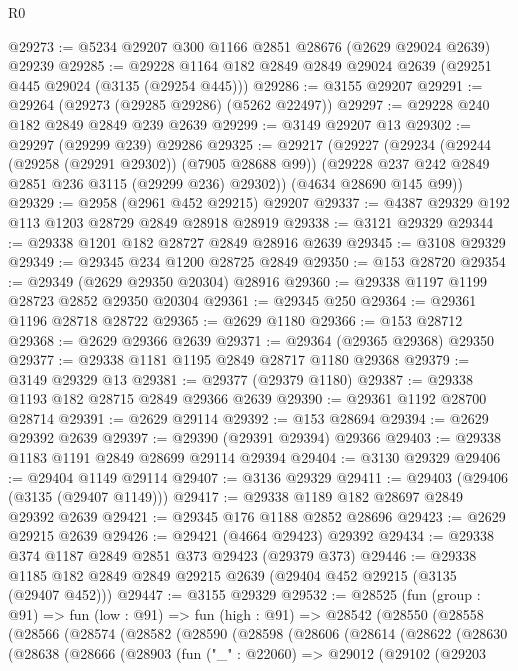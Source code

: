 \begin{lexlean}{R0}
\begin{coremodule}
@29273 := @5234 @29207 @300 @1166 @2851 @28676 (@2629 @29024 @2639) @29239
@29285 := @29228 @1164 @182 @2849 @2849 @29024 @2639 (@29251 @445 @29024 (@3135 (@29254 @445)))
@29286 := @3155 @29207
@29291 := @29264 (@29273 (@29285 @29286) (@5262 @22497))
@29297 := @29228 @240 @182 @2849 @2849 @239 @2639
@29299 := @3149 @29207 @13
@29302 := @29297 (@29299 @239) @29286
@29325 := @29217
    (@29227
      (@29234
        (@29244 (@29258 (@29291 @29302)) (@7905 @28688 @99))
        (@29228 @237 @242 @2849 @2851 @236 @3115 (@29299 @236) @29302))
      (@4634 @28690 @145 @99))
@29329 := @2958 (@2961 @452 @29215) @29207
@29337 := @4387 @29329 @192 @113 @1203 @28729 @2849 @28918 @28919
@29338 := @3121 @29329
@29344 := @29338 @1201 @182 @28727 @2849 @28916 @2639
@29345 := @3108 @29329
@29349 := @29345 @234 @1200 @28725 @2849
@29350 := @153 @28720
@29354 := @29349 (@2629 @29350 @20304) @28916
@29360 := @29338 @1197 @1199 @28723 @2852 @29350 @20304
@29361 := @29345 @250
@29364 := @29361 @1196 @28718 @28722
@29365 := @2629 @1180
@29366 := @153 @28712
@29368 := @2629 @29366 @2639
@29371 := @29364 (@29365 @29368) @29350
@29377 := @29338 @1181 @1195 @2849 @28717 @1180 @29368
@29379 := @3149 @29329 @13
@29381 := @29377 (@29379 @1180)
@29387 := @29338 @1193 @182 @28715 @2849 @29366 @2639
@29390 := @29361 @1192 @28700 @28714
@29391 := @2629 @29114
@29392 := @153 @28694
@29394 := @2629 @29392 @2639
@29397 := @29390 (@29391 @29394) @29366
@29403 := @29338 @1183 @1191 @2849 @28699 @29114 @29394
@29404 := @3130 @29329
@29406 := @29404 @1149 @29114
@29407 := @3136 @29329
@29411 := @29403 (@29406 (@3135 (@29407 @1149)))
@29417 := @29338 @1189 @182 @28697 @2849 @29392 @2639
@29421 := @29345 @176 @1188 @2852 @28696
@29423 := @2629 @29215 @2639
@29426 := @29421 (@4664 @29423) @29392
@29434 := @29338 @374 @1187 @2849 @2851 @373 @29423 (@29379 @373)
@29446 := @29338 @1185 @182 @2849 @2849 @29215 @2639 (@29404 @452 @29215 (@3135 (@29407 @452)))
@29447 := @3155 @29329
@29532 := @28525
    (fun (group : @91) =>
    fun (low : @91) =>
    fun (high : @91) =>
    @28542
      (@28550
        (@28558
          (@28566
            (@28574
              (@28582
                (@28590
                  (@28598
                    (@28606
                      (@28614
                        (@28622
                          (@28630
                            (@28638
                              (@28666
                                (@28903
                                  (fun ("_" : @22060) =>
                                  @29012
                                    (@29102
                                      (@29203

\end{coremodule}
\end{lexlean}
